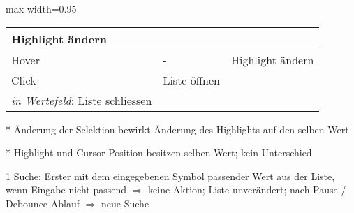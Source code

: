 \begin{table}[!htb]
\begin{adjustbox}{max width=0.95\textwidth}
\begin{threeparttable}
\begin{tabular}{ l || l | l }
{                                                                         Highlight ändern}        \\
                \hline
                Hover      & -                     & Highlight ändern                             \\
                \hline
                Click      & Liste öffnen          & \tbbr{\emph{in Liste}: Selektion ändern \\
                                                           \emph{in Wertefeld}: Liste schliessen} \\
                \hline
            \end{tabular}
            \begin{tablenotes}
                \scriptsize
                \item[*] Änderung der Selektion bewirkt Änderung des Highlights auf den selben Wert
                \item[*] Highlight und Cursor Position besitzen selben Wert; kein Unterschied
                \item
                \item[1] Suche: Erster mit dem eingegebenen Symbol passender Wert aus der Liste, wenn Eingabe nicht passend $\Rightarrow$ keine Aktion; 
                                Liste unverändert; nach Pause / Debounce-Ablauf $\Rightarrow$ neue Suche
            \end{tablenotes}
        \end{threeparttable}
    \end{adjustbox}
\end{table}
